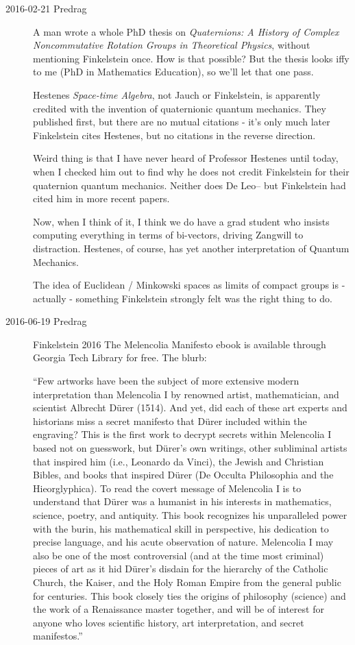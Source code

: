 \begin{description}
\item[2016-02-21 Predrag]
A man wrote a whole PhD thesis
    on {\em Quaternions: A History of Complex Noncommutative Rotation
    Groups in Theoretical Physics}, without mentioning  Finkelstein
    \etal{} once. How is that possible? But the
    thesis looks iffy to me (PhD in Mathematics Education), so we'll
    let that one pass.

Hestenes {\em Space-time Algebra}, not Jauch or
Finkelstein, is apparently credited with the
invention of quaternionic quantum mechanics. They published first, but
there are no mutual citations - it's only much later Finkelstein cites
Hestenes, but no citations in the reverse direction.

Weird thing is that I have never heard of Professor Hestenes until
today, when I checked him out to find why he does not credit
Finkelstein \etal{} for their quaternion quantum
mechanics. Neither does De Leo-- but Finkelstein had cited
him in more recent papers.

Now, when I think of it, I think we do have a grad student who insists
computing everything in terms of bi-vectors, driving Zangwill to
distraction. Hestenes, of course, has yet another interpretation of
Quantum Mechanics.

The idea of Euclidean / Minkowski spaces as limits of compact groups is
- actually - something Finkelstein strongly felt was the right thing to
do.

\item[2016-06-19 Predrag]
Finkelstein 2016
{{The Melencolia Manifesto}} ebook is available through Georgia Tech Library
for free. The blurb:

``Few artworks have been the subject of more extensive modern
interpretation than Melencolia I by renowned artist, mathematician, and
scientist Albrecht Dürer (1514). And yet, did each of these art experts
and historians miss a secret manifesto that Dürer included within the
engraving? This is the first work to decrypt secrets within Melencolia I
based not on guesswork, but D\"urer's own writings, other subliminal
artists that inspired him (i.e., Leonardo da Vinci), the Jewish and
Christian Bibles, and books that inspired D\"urer (De Occulta Philosophia
and the Hieorglyphica). To read the covert message of Melencolia I is to
understand that D\"urer was a humanist in his interests in mathematics,
science, poetry, and antiquity. This book recognizes his unparalleled
power with the burin, his mathematical skill in perspective, his
dedication to precise language, and his acute observation of nature.
Melencolia I may also be one of the most controversial (and at the time
most criminal) pieces of art as it hid D\"urer's disdain for the hierarchy
of the Catholic Church, the Kaiser, and the Holy Roman Empire from the
general public for centuries. This book closely ties the origins of
philosophy (science) and the work of a Renaissance master together, and
will be of interest for anyone who loves scientific history, art
interpretation, and secret manifestos.''


\end{description}
